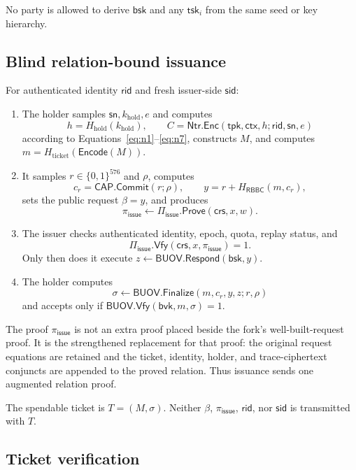 \documentclass[11pt]{article}
\newcommand{\BUOV}{\mathsf{BUOV}}
\newcommand{\RBBC}{\mathsf{RBBC}}
\newcommand{\Piiss}{\Pi_{\mathsf{issue}}}
\newcommand{\rid}{\mathsf{rid}}
\newcommand{\sn}{\mathsf{sn}}
\newcommand{\ctx}{\mathsf{ctx}}
\begin{document}
No party is allowed to derive $\mathsf{bsk}$ and any $\mathsf{tsk}_i$ from the
same seed or key hierarchy.

\subsection{Blind relation-bound issuance}

For authenticated identity $\rid$ and fresh issuer-side $\mathsf{sid}$:

\begin{enumerate}[leftmargin=*]
  \item The holder samples $\sn,k_{\mathrm{hold}},e$ and computes
  \[
   h=H_{\mathrm{hold}}(k_{\mathrm{hold}}),\qquad
   C=\mathsf{Ntr.Enc}(\mathsf{tpk},\ctx,h;\rid,\sn,e)
  \]
  according to Equations~\eqref{eq:n1}--\eqref{eq:n7},
  constructs $M$, and
  computes $m=H_{\mathrm{ticket}}(\mathsf{Encode}(M))$.
  \item It samples $r\in\{0,1\}^{576}$ and $\rho$, computes
  \[
    c_r=\mathsf{CAP.Commit}(r;\rho),\qquad
    y=r+H_{\RBBC}(m,c_r),
  \]
  sets the public request $\beta=y$, and produces
  \[
     \pi_{\mathsf{issue}}
     \leftarrow \Piiss.\mathsf{Prove}(\mathsf{crs},x,w).
  \]
  \item The issuer checks authenticated identity, epoch, quota, replay status,
  and
  \[
    \Piiss.\mathsf{Vfy}(\mathsf{crs},x,\pi_{\mathsf{issue}})=1.
  \]
  Only then does it execute
  $z\leftarrow\BUOV.\mathsf{Respond}(\mathsf{bsk},y)$.
  \item The holder computes
  \[
    \sigma\leftarrow
    \BUOV.\mathsf{Finalize}(m,c_r,y,z;r,\rho)
  \]
  and accepts only if
  $\BUOV.\mathsf{Vfy}(\mathsf{bvk},m,\sigma)=1$.
\end{enumerate}

The proof $\pi_{\mathsf{issue}}$ is not an extra proof placed beside the
fork's well-built-request proof.  It is the strengthened replacement for
that proof: the original request equations are retained and the ticket,
identity, holder, and trace-ciphertext conjuncts are appended to the proved
relation.  Thus issuance sends one augmented relation proof.

The spendable ticket is $T=(M,\sigma)$.  Neither $\beta$,
$\pi_{\mathsf{issue}}$, $\rid$, nor $\mathsf{sid}$ is transmitted with $T$.

\subsection{Ticket verification}
\end{document}
